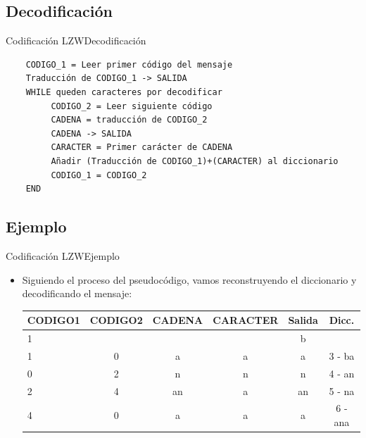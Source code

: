 \documentclass[10pt,compress]{beamer} %
\begin{document}
\subsection{Decodificación}
\begin{frame}[fragile]{Codificación LZW}{Decodificación}
  \footnotesize
  \begin{verbatim}
    CODIGO_1 = Leer primer código del mensaje
    Traducción de CODIGO_1 -> SALIDA
    WHILE queden caracteres por decodificar
         CODIGO_2 = Leer siguiente código
         CADENA = traducción de CODIGO_2
         CADENA -> SALIDA
         CARACTER = Primer carácter de CADENA
         Añadir (Traducción de CODIGO_1)+(CARACTER) al diccionario
         CODIGO_1 = CODIGO_2
    END
\end{verbatim}
\end{frame}

\subsection{Ejemplo}
\begin{frame}{Codificación LZW}{Ejemplo}
	\begin{itemize}
    \item Siguiendo el proceso del pseudocódigo, vamos reconstruyendo el diccionario y decodificando el mensaje:
    \begin{tabular}{lccccc}
      CODIGO1 & CODIGO2  & CADENA & CARACTER & Salida & Dicc.\\
      \hline
      1 &   &   &   & b &\\
      1 & 0 & a & a & a & 3 - ba \\
      0 & 2 & n & n & n & 4 - an \\
      2 & 4 & an & a & an & 5 - na \\
      4 & 0 & a & a & a & 6 - ana \\
      \end{tabular}
	\end{itemize}
\end{frame}
\end{document}
